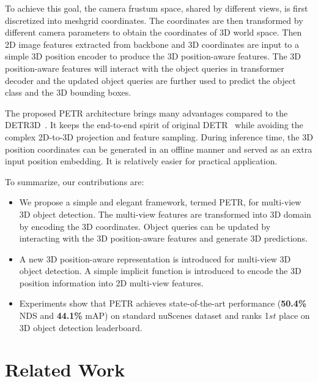 \documentclass[runningheads]{llncs}
\begin{document}
To achieve this goal, the camera frustum space, shared by different views, is first discretized into meshgrid coordinates. The coordinates are then transformed by different camera parameters to obtain the coordinates of 3D world space. 
Then 2D image features extracted from backbone and 3D coordinates are input to a simple 3D position encoder to produce the 3D position-aware features.
The 3D position-aware features will interact with the object queries in transformer decoder and the updated object queries are further used to predict the object class and the 3D bounding boxes.  

The proposed PETR architecture brings many advantages compared to the DETR3D~\cite{wang2022detr3d}. It keeps the end-to-end spirit of original DETR~\cite{carion2020detr} while avoiding the complex 2D-to-3D projection and feature sampling. During inference time, the 3D position coordinates can be generated in an offline manner and served as an extra input position embedding. It is relatively easier for practical application.

To summarize, our contributions are:
\begin{itemize}
\item We propose a simple and elegant framework, termed PETR, for multi-view 3D object detection. The multi-view features are transformed into 3D domain by encoding the 3D coordinates. Object queries can be updated by interacting with the 3D position-aware features and generate 3D predictions.
\item A new 3D position-aware representation is introduced for multi-view 3D object detection. A simple implicit function is introduced to encode the 3D position information into 2D multi-view features.
\item Experiments show that PETR achieves state-of-the-art performance (\textbf{50.4\%} NDS and \textbf{44.1\%} mAP) on standard nuScenes dataset and ranks 1$st$ place on 3D object detection leaderboard. 
\end{itemize}
\section{Related Work}
\end{document}
